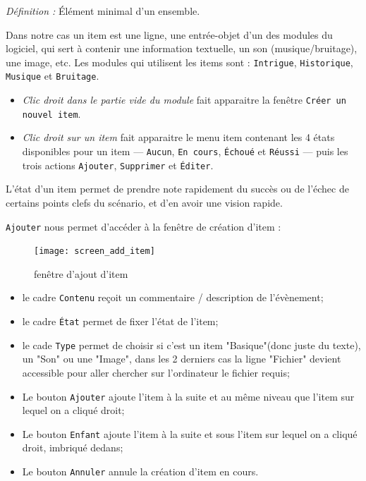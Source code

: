 \documentclass[a4paper,12pt]{article}
\newcommand*{\interfaceitem}[1]{\texttt{#1}}
\begin{document}
\emph{Définition : } Élément minimal d'un ensemble.

Dans notre cas un item est une ligne, une entrée-objet d'un des modules du logiciel, qui sert à contenir une information textuelle, un son (musique/bruitage), une image, etc.
Les modules qui utilisent les items sont : \interfaceitem{Intrigue}, \interfaceitem{Historique}, \interfaceitem{Musique} et \interfaceitem{Bruitage}.

\begin{itemize}
    \item\emph{Clic droit dans le partie vide du module} fait apparaitre la fenêtre \interfaceitem{Créer un nouvel item}.
    \item\emph{Clic droit sur un item} fait apparaitre le menu item contenant les 4 états disponibles pour un item --- \interfaceitem{Aucun}, \interfaceitem{En cours}, \interfaceitem{Échoué} et \interfaceitem{Réussi} --- puis les trois actions \interfaceitem{Ajouter}, \interfaceitem{Supprimer} et \interfaceitem{Éditer}.
\end{itemize}
L'état d'un item permet de prendre note rapidement du succès ou de l'échec de certains points clefs du scénario, et d'en avoir une vision rapide.

\interfaceitem{Ajouter} nous permet d'accéder à la fenêtre de création d'item :
\begin{figure}[h]
    \texttt{[image: screen\_add\_item]}
    \caption{fenêtre d'ajout d'item}
\end{figure}
\begin{itemize}
    \item le cadre \interfaceitem{Contenu} reçoit un commentaire / description de l'évènement;
    \item le cadre \interfaceitem{État} permet de fixer l'état de l'item;
    \item le cade \interfaceitem{Type} permet de choisir si c'est un item "Basique"(donc juste du texte), un "Son" ou une "Image", dans les 2 derniers cas la ligne "Fichier" devient accessible pour aller chercher sur l'ordinateur le fichier requis;
    \item Le bouton \interfaceitem{Ajouter} ajoute l'item à la suite et au même niveau que l'item sur lequel on a cliqué droit;
    \item Le bouton \interfaceitem{Enfant} ajoute l'item à la suite et sous l'item sur lequel on a cliqué droit, imbriqué dedans;
    \item Le bouton \interfaceitem{Annuler} annule la création d'item en cours.
\end{itemize}
\end{document}

